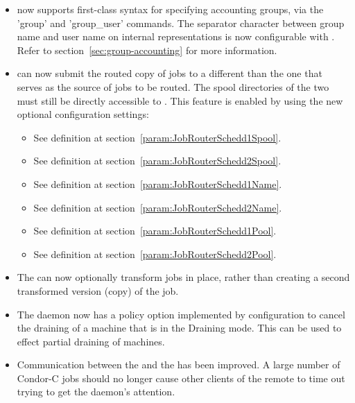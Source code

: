 \begin{itemize}

\item {} now supports first-class syntax for specifying
accounting groups, via the 'group' and 'group\_user' commands.  The
separator character between group name and user name on internal
representations is now configurable with .
Refer to section~\ref{sec:group-accounting} for more information.

\item {} can now submit the routed copy of jobs to a
different  than the one that serves as the source of
jobs to be routed.  The spool directories of the two
 must still be directly accessible to
.  This feature is enabled by using the new
optional configuration settings:

\begin{itemize}
\item {}
See definition at section~\ref{param:JobRouterSchedd1Spool}.
\item {}
See definition at section~\ref{param:JobRouterSchedd2Spool}.
\item {}
See definition at section~\ref{param:JobRouterSchedd1Name}.
\item {}
See definition at section~\ref{param:JobRouterSchedd2Name}.
\item {}
See definition at section~\ref{param:JobRouterSchedd1Pool}.
\item {}
See definition at section~\ref{param:JobRouterSchedd2Pool}.
\end{itemize}

\item The  can now optionally transform jobs in place,
rather than creating a second transformed version (copy) of the job.

\item The  daemon now has a policy option implemented
by configuration to cancel the draining
of a machine that is in the Draining mode.  This can be used to effect
partial draining of machines.

\item Communication between the  and the  has
been improved. A large number of Condor-C jobs should no longer cause
other clients of the remote  to time out trying to get the
 daemon's attention.


\end{itemize}
